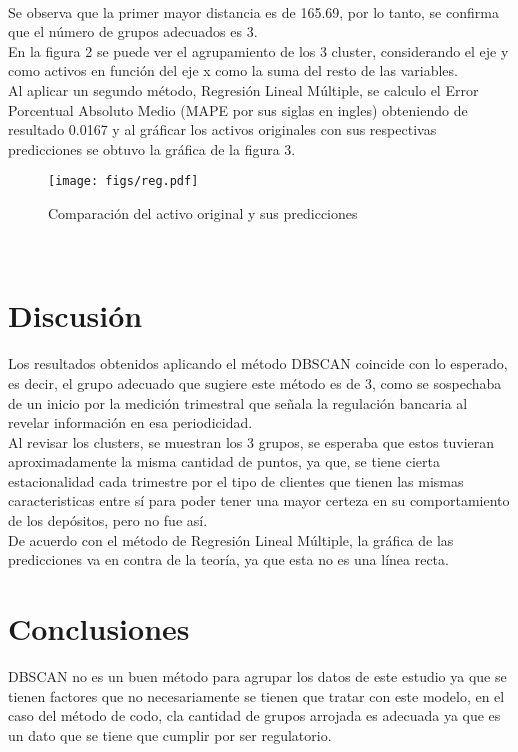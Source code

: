 \documentclass{article}
\begin{document}
\\

Se observa que la primer mayor distancia es de 165.69, por lo tanto, se confirma que el número de grupos adecuados es 3.
\\

En la figura 2 se puede ver el agrupamiento de los 3 cluster, considerando el eje y como activos en función del eje x como la suma del resto de las variables.
\\

Al aplicar un segundo método, Regresión Lineal Múltiple, se calculo el Error Porcentual Absoluto Medio (MAPE por sus siglas en ingles) obteniendo de resultado 0.0167 y al gráficar los activos originales con sus respectivas predicciones se obtuvo la gráfica de la figura 3.
\\

\begin{figure}
    \centering
    \texttt{[image: figs/reg.pdf]}
    \caption{Comparación del activo original y sus predicciones}
    \label{fig:Método de codo}
\end{figure}
\\

\section{Discusión}

Los resultados obtenidos aplicando el método DBSCAN coincide con lo esperado, es decir, 
 el grupo adecuado que sugiere este método es de 3, como se sospechaba de un inicio por la medición trimestral que señala la regulación bancaria al revelar información en esa periodicidad.
\\

 Al revisar los clusters, se muestran los 3 grupos, se esperaba que estos tuvieran aproximadamente la misma cantidad de puntos, ya que, se tiene cierta estacionalidad cada trimestre por el tipo de clientes que tienen las mismas caracteristicas entre sí para poder tener una mayor certeza en su comportamiento de los depósitos, pero no fue así.
\\

 De acuerdo con el método de Regresión Lineal Múltiple, la gráfica de las predicciones va en contra de la teoría, ya que esta no es una línea recta.

\section{Conclusiones}
DBSCAN no es un buen método para agrupar los datos de este estudio ya que se tienen factores que no necesariamente se tienen que tratar con este modelo, en el caso del método de codo, cla cantidad de grupos arrojada es adecuada ya que es un dato que se tiene que cumplir por ser regulatorio.
\\
\end{document}
